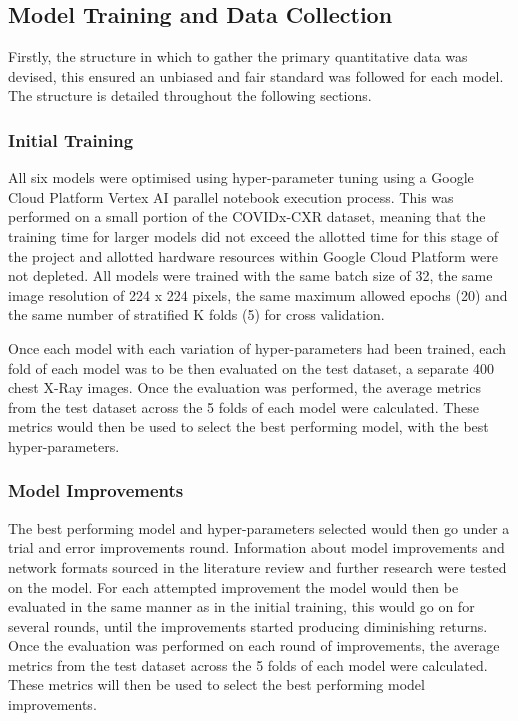 \subsection{Model Training and Data Collection}
Firstly, the structure in which to gather the primary quantitative data was devised, this ensured an unbiased and fair standard was followed for each model. The structure is detailed throughout the following sections.


\subsubsection{Initial Training}
All six models were optimised using hyper-parameter tuning using a Google Cloud Platform Vertex AI parallel notebook execution process. This was performed on a small portion of the COVIDx-CXR dataset, meaning that the training time for larger models did not exceed the allotted time for this stage of the project and allotted hardware resources within Google Cloud Platform were not depleted. All models were trained with the same batch size of 32, the same image resolution of 224 x 224 pixels, the same maximum allowed epochs (20) and the same number of stratified K folds (5) for cross validation.

Once each model with each variation of hyper-parameters had been trained, each fold of each model was to be then evaluated on the test dataset, a separate 400 chest X-Ray images. Once the evaluation was performed, the average metrics from the test dataset across the 5 folds of each model were calculated. These metrics would then be used to select the best performing model, with the best hyper-parameters.

\subsubsection{Model Improvements}
The best performing model and hyper-parameters selected would then go under a trial and error improvements round. Information about model improvements and network formats sourced in the literature review and further research were tested on the model. For each attempted improvement the model would then be evaluated in the same manner as in the initial training, this would go on for several rounds, until the improvements started producing diminishing returns. Once the evaluation was performed on each round of improvements, the average metrics from the test dataset across the 5 folds of each model were calculated. These metrics will then be used to select the best performing model improvements.

